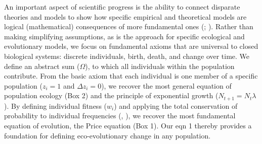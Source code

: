 \documentclass[
]{article}
\begin{document}
An important aspect of scientific progress is the ability to connect
disparate theories and models to show how specific empirical and
theoretical models are logical (mathematical) consequences of more
fundamental ones (;
). Rather than making
simplifying assumptions, as is the approach for specific ecological and
evolutionary models, we focus on fundamental axioms that are universal
to closed biological systems: discrete individuals, birth, death, and
change over time. We define an abstract sum (\(\Omega\)), to which all
individuals within the population contribute. From the basic axiom that
each individual is one member of a specific population (\(z_{i} = 1\)
and \(\Delta z_{i} = 0\)), we recover the most general equation of
population ecology (Box 2) and the principle of exponential growth
(\(N_{t+1} = N_{t}\lambda\)). By defining individual fitness (\(w_{i}\))
and applying the total conservation of probability to individual
frequencies (,
), we recover the most fundamental
equation of evolution, the Price equation (Box 1). Our eqn 1 thereby
provides a foundation for defining eco-evolutionary change in any
population.
\end{document}
